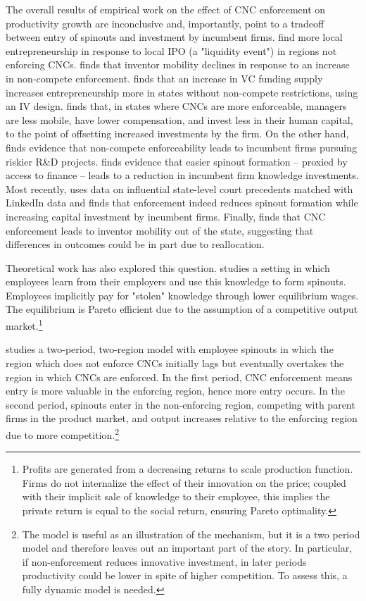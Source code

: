 \documentclass[11pt,english]{article}
\theoremstyle{remark}
\begin{document}
The overall results of empirical work on the effect of CNC enforcement on productivity growth are inconclusive and, importantly, point to a tradeoff between entry of spinouts and investment by incumbent firms. \cite{stuart_liquidity_2003} find more local  entrepreneurship in response to local IPO (a "liquidity event") in regions not enforcing CNCs. \cite{marx_mobility_2009} finds that inventor mobility declines in response to an increase in non-compete enforcement. \cite{samila_venture_2010} finds that an increase in VC funding supply increases entrepreneurship more in states without non-compete restrictions, using an IV design. \cite{garmaise_ties_2011} finds that, in states where CNCs are more enforceable, managers are less mobile, have lower compensation, and invest less in their human capital, to the point of offsetting increased investments by the firm. On the other hand, \cite{conti_non-competition_2014} finds evidence that non-compete enforceability leads to incumbent firms pursuing riskier R\&D projects. \cite{colombo_does_2013} finds evidence that easier spinout formation -- proxied by access to finance -- leads to a reduction in incumbent firm knowledge investments.  Most recently, \cite{jeffers_impact_2018} uses data on influential state-level court precedents matched with LinkedIn data and finds that enforcement indeed reduces spinout formation while increasing capital investment by incumbent firms. Finally, \cite{marx_regional_2015} finds that CNC enforcement leads to inventor mobility out of the state, suggesting that differences in outcomes could be in part due to reallocation. 

Theoretical work has also explored this question. \cite{franco_spin-outs:_2006} studies a setting in which employees learn from their employers and use this knowledge to form spinouts. Employees implicitly pay for "stolen" knowledge through lower equilibrium wages. The equilibrium is Pareto efficient due to the assumption of a competitive output market.\footnote{Profits are generated from a decreasing returns to scale production function. Firms do not internalize the effect of their innovation on the price; coupled with their implicit sale of knowledge to their employee, this implies the private return is equal to the social return, ensuring Pareto optimality.}  

\cite{franco_covenants_2008} studies a two-period, two-region model with employee spinouts in which the region which does not enforce CNCs initially lags but eventually overtakes the region in which CNCs are enforced. In the first period, CNC enforcement means entry is more valuable in the enforcing region, hence more entry occurs. In the second period, spinouts enter in the non-enforcing region, competing with parent firms in the product market, and output increases relative to the enforcing region due to more competition.\footnote{The model is useful as an illustration of the mechanism, but it is a two period model and therefore leaves out an important part of the story. In particular, if non-enforcement reduces innovative investment, in later periods productivity could be lower in spite of higher competition. To assess this, a fully dynamic model is needed.}
\end{document}
